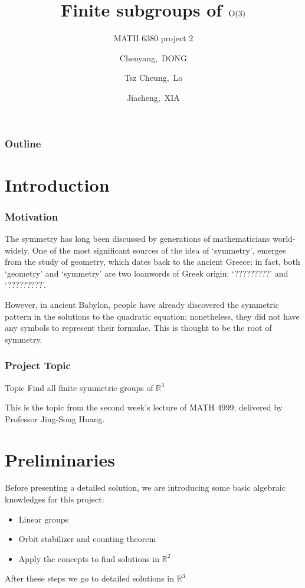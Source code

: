 \documentclass{beamer}
\title[MATH 6380 Project 2]{Finite subgroups of $\textup{O}(3)$}
\subtitle{MATH 6380 project 2}
\author[C.Dong, T.C.LO, J.Xia]
{Chenyang,~DONG \and Tsz Cheung,~Lo \and Jiacheng,~XIA}
\newcommand{\textgreek}[1]{\begingroup\fontencoding{LGR}\selectfont#1\endgroup}
\begin{document}
\frame{\titlepage}

\begin{frame}
\frametitle{Outline}
\tableofcontents
\end{frame}

\section{Introduction}
\begin{frame}
\frametitle{Motivation}
The symmetry has long been discussed by generations of mathematicians world-widely. One of the most significant sources of the idea of `symmetry', emerges from the study of geometry, which dates back to the ancient Greece; in fact, both `geometry' and `symmetry' are two loanwords of Greek origin: `\textgreek{?????????}' and `\textgreek{?????????}'. 

However, in ancient Babylon, people have already discovered the symmetric pattern in the solutions to the quadratic equation; nonetheless, they did not have any symbols to represent their formulae. This is thought to be the root of symmetry. 
\end{frame}

\begin{frame}
\frametitle{Project Topic}
\begin{alertblock}{Topic}
Find all finite symmetric groups of $\mathbb{R}^3$
\end{alertblock}
This is the topic from the second week's lecture of MATH 4999, delivered by Professor Jing-Song Huang.
\end{frame}

\section{Preliminaries}
\begin{frame}
\begin{block}{}
Before presenting a detailed solution, we are introducing some basic algebraic knowledges for this project:
\end{block}
\begin{itemize}
\item<1-> Linear groups
\item<2-> Orbit stabilizer and counting theorem
\item<3-> Apply the concepts to find solutions in $\mathbb{R}^2$

\end{itemize}
After these steps we go to detailed solutions in $\mathbb{R}^3$
\end{frame}
\end{document}
